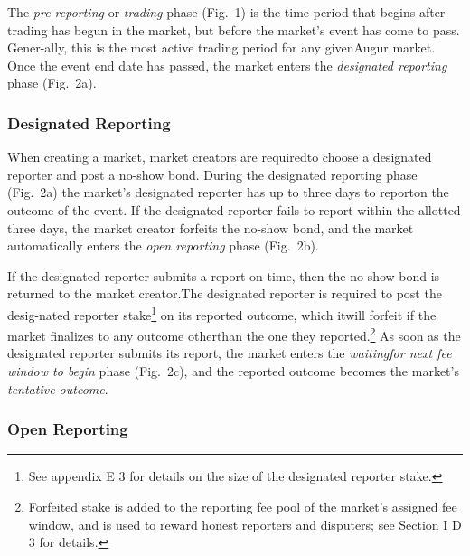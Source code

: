 \documentclass[12pt,floatfix,reprint,nofootinbib,amsmath,amssymb,epsfig,pre,floats,letterpaper,groupedaffiliation]{revtex4-1}
\theoremstyle{definition}
\theoremstyle{definition}
\begin{document}
The \textit{pre-reporting} or \textit{trading} phase (Fig.~1) is the time period that begins after trading has begun in the market, but before the market's event has come to pass. Gener-\linebreak ally, this is the most active trading period for any given\linebreak Augur market. Once the event end date has passed, the market enters the \textit{designated reporting} phase (Fig.~2a).

\subsubsection{Designated Reporting}

When creating a market, market creators are required\linebreak to choose a designated reporter and post a no-show bond. During the designated reporting phase (Fig.~2a) the market's designated reporter has up to three days to report\linebreak on the outcome of the event. If the designated reporter fails to report within the allotted three days, the market creator forfeits the no-show bond, and the market automatically enters the \textit{open reporting} phase (Fig.~2b).

If the designated reporter submits a report on time, then the no-show bond is returned to the market creator.\linebreak The designated reporter is required to post the desig-\linebreak nated reporter stake\footnote{See appendix E 3 for details on the size of the designated reporter stake.} on its reported outcome, which it\linebreak will forfeit if the market finalizes to any outcome other\linebreak than the one they reported.\footnote{Forfeited stake is added to the reporting fee pool of the market's assigned fee window, and is used to reward honest reporters and disputers; see Section I D 3 for details.} As soon as the designated reporter submits its report, the market enters the \textit{waiting\linebreak for next fee window to begin} phase (Fig.~2c), and the re\-ported outcome becomes the market's \textit{tentative outcome}.

\subsubsection{Open Reporting}
\end{document}
